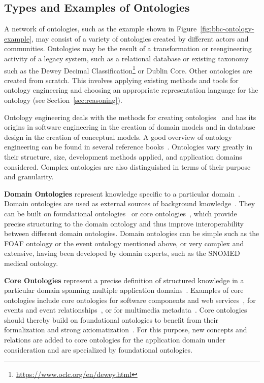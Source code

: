 \documentclass[a4paper,USenglish]{tgdk-v2021}
\newcommand{\myurl}[1]{\footnote{\url{#1}}}
\begin{document}
\subsection{Types and Examples of Ontologies}
\label{sec:ontologies}

A network of ontologies, such as the example shown in Figure~\ref{fig:bbc-ontology-example}, may consist of a variety of ontologies created by different actors and communities. 
Ontologies may be the result of a transformation or reengineering activity of a legacy system, such as a relational database or existing taxonomy such as the Dewey Decimal Classification\myurl{https://www.oclc.org/en/dewey.html} or Dublin Core.
Other ontologies are created from scratch.
This involves applying existing methods and tools for ontology engineering and choosing an appropriate representation language for the ontology (see Section~\ref{sec:reasoning}). 

Ontology engineering deals with the methods for creating ontologies~\cite{GomezPerezFernandezLopezOntologicalEngineering} and has its origins in software engineering in the creation of domain models and in database design in the creation of conceptual models.
A good overview of ontology engineering can be found in several reference books~\cite{GomezPerezFernandezLopezOntologicalEngineering}.
Ontologies vary greatly in their structure, size, development methods applied, and application domains considered. 
Complex ontologies are also distinguished in terms of their purpose and granularity.

\textbf{Domain Ontologies} represent knowledge specific to a particular domain~\cite{Euzenat2007a,OberleMiddleware2006}. 
Domain ontologies are used as external sources of background knowledge~\cite{Euzenat2007a}.
They can be built on foundational ontologies~\cite{Oberle:2007:DES:1290204.1290385} or core ontologies~\cite{ScherpEtAlDesigningCoreOntologiesIOS2011}, which provide precise structuring to the domain ontology and thus improve interoperability between different domain ontologies.
Domain ontologies can be simple such as the FOAF ontology or the event ontology mentioned above, or very complex and extensive, having been developed by domain experts, such as the SNOMED medical ontology.

\textbf{Core Ontologies} represent a precise definition of structured knowledge in a particular domain spanning multiple application domains~\cite{ScherpEtAlDesigningCoreOntologiesIOS2011,OberleMiddleware2006}. 
Examples of core ontologies include core ontologies for software components and web services~\cite{OberleMiddleware2006}, for events and event relationships~\cite{emf-mtap}, or for multimedia metadata~\cite{www-m3o}.
Core ontologies should thereby build on foundational ontologies to benefit from their formalization and strong axiomatization~\cite{ScherpEtAlDesigningCoreOntologiesIOS2011}.
For this purpose, new concepts and relations are added to core ontologies for the application domain under consideration and are specialized by foundational ontologies.
 
\end{document}
